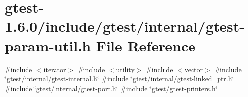 \hypertarget{gtest-param-util_8h}{\section{gtest-\/1.6.0/include/gtest/internal/gtest-\/param-\/util.h \-File \-Reference}
\label{dc/df2/gtest-param-util_8h}
}
{\ttfamily \#include $<$iterator$>$}\*
{\ttfamily \#include $<$utility$>$}\*
{\ttfamily \#include $<$vector$>$}\*
{\ttfamily \#include \char`\"{}gtest/internal/gtest-\/internal.\-h\char`\"{}}\*
{\ttfamily \#include \char`\"{}gtest/internal/gtest-\/linked\-\_\-ptr.\-h\char`\"{}}\*
{\ttfamily \#include \char`\"{}gtest/internal/gtest-\/port.\-h\char`\"{}}\*
{\ttfamily \#include \char`\"{}gtest/gtest-\/printers.\-h\char`\"{}}\*
